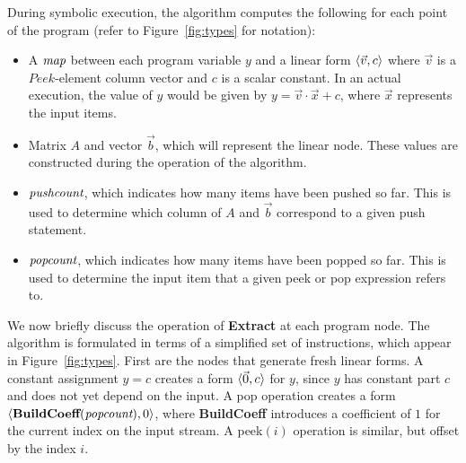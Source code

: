 \documentclass{sig-alternate}
\begin{document}
During symbolic execution, the algorithm computes the following for
each point of the program (refer to Figure~\ref{fig:types} for
notation):
\begin{itemize}

\vspace{-6pt}
\item A $\mbox{\it map}$ between each program variable $y$ and a linear form
$\langle{\vec{v}}, {c}\rangle$ where $\vec{v}$ is a $Peek$-element column vector
and $c$ is a scalar constant. In an actual execution, the value of $y$
would be given by $y = \vec{v} \cdot \vec{x} + c$, where $\vec{x}$
represents the input items.
\vspace{-6pt}

\item Matrix $A$ and vector $\vec b$, which will represent the linear node.
These values are constructed during the operation of the algorithm.
\vspace{-6pt}

\item $\mbox{\it pushcount}$, which indicates how many items have been
pushed so far.  This is used to determine which column of $A$ and
$\vec{b}$ correspond to a given push statement.
\vspace{-6pt}

\item $\mbox{\it popcount}$, which indicates how many items have been popped
so far.  This is used to determine the input item that a given peek or
pop expression refers to.
\vspace{-6pt}

\end{itemize}

We now briefly discuss the operation of {\bf Extract} at each program
node.  The algorithm is formulated in terms of a simplified set of
instructions, which appear in Figure~\ref{fig:types}.  First are the
nodes that generate fresh linear forms.  A constant assignment $y = c$
creates a form $\langle{\vec 0}, {c}\rangle$ for $y$, since $y$ has constant part
$c$ and does not yet depend on the input.  A pop operation
creates a form $\langle{\mbox{\bf BuildCoeff}(\mbox{\it popcount})}, {0}\rangle$, where
{\bf BuildCoeff} introduces a coefficient of $1$ for the current index
on the input stream.  A peek$(i)$ operation is similar, but
offset by the index $i$.
\end{document}
